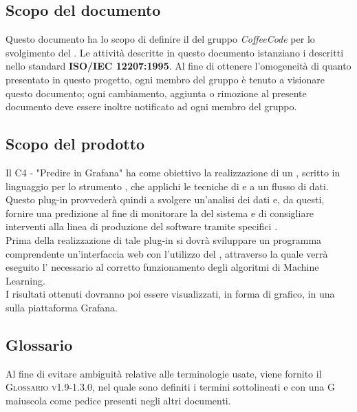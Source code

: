 \documentclass[../norme-di-progetto.tex]{subfiles}
\begin{document}
\subsection{Scopo del documento}
Questo documento ha lo scopo di definire il  del gruppo \emph{CoffeeCode} per lo svolgimento del .
Le attività descritte in questo documento istanziano i  descritti nello standard \textbf{ISO/IEC 12207:1995}. Al fine di ottenere l'omogeneità di quanto presentato in questo progetto, ogni membro del gruppo è tenuto a visionare questo documento; ogni cambiamento, aggiunta o rimozione al presente documento deve essere inoltre notificato ad ogni membro del gruppo.

\subsection{Scopo del prodotto}
Il  C4 - "Predire in Grafana" ha come obiettivo la realizzazione di un , scritto in linguaggio  per lo strumento  , che applichi le tecniche di   e  a un flusso di dati. Questo plug-in provvederà quindi a svolgere un'analisi dei dati e, da questi, fornire una predizione al fine di monitorare la  del sistema e di consigliare interventi alla linea di produzione del software tramite specifici . \\
Prima della realizzazione di tale plug-in si dovrà sviluppare un programma comprendente un'interfaccia web con l'utilizzo del  , attraverso la quale verrà eseguito l' necessario al corretto funzionamento degli algoritmi di Machine Learning. \\
I risultati ottenuti dovranno poi essere visualizzati, in forma di grafico, in una  sulla piattaforma Grafana.

\subsection{Glossario}
Al fine di evitare ambiguità relative alle terminologie usate, viene fornito il \textsc{Glossario v1.9-1.3.0}, nel quale sono definiti i termini sottolineati e con una G maiuscola come pedice presenti negli altri documenti.
\end{document}
